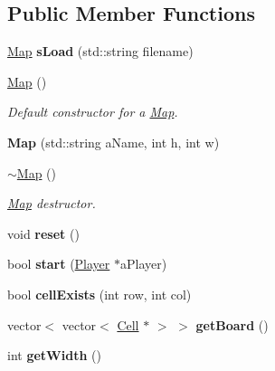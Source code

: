 \subsection*{Public Member Functions}
\begin{DoxyCompactItemize}
\item 
\hypertarget{class_map_ab98b96f44d9fef2a266556297cee71be}{}\label{class_map_ab98b96f44d9fef2a266556297cee71be} 
\hyperlink{class_map}{Map} {\bfseries s\+Load} (std\+::string filename)
\item 
\hyperlink{class_map_a0f5ad0fd4563497b4214038cbca8b582}{Map} ()
\begin{DoxyCompactList}\small\item\em Default constructor for a \hyperlink{class_map}{Map}. \end{DoxyCompactList}\item 
\hypertarget{class_map_a2edce4c7d4627d9f0ed6ae08021590ed}{}\label{class_map_a2edce4c7d4627d9f0ed6ae08021590ed} 
{\bfseries Map} (std\+::string a\+Name, int h, int w)
\item 
\hypertarget{class_map_aa403fbe09394ccf39747588f5168e3b2}{}\label{class_map_aa403fbe09394ccf39747588f5168e3b2} 
\hyperlink{class_map_aa403fbe09394ccf39747588f5168e3b2}{$\sim$\+Map} ()
\begin{DoxyCompactList}\small\item\em \hyperlink{class_map}{Map} destructor. \end{DoxyCompactList}\item 
\hypertarget{class_map_a904c445fdce79257fedeba09070cf88a}{}\label{class_map_a904c445fdce79257fedeba09070cf88a} 
void {\bfseries reset} ()
\item 
\hypertarget{class_map_af7c347ec2e29fc7b97c81730f94176f2}{}\label{class_map_af7c347ec2e29fc7b97c81730f94176f2} 
bool {\bfseries start} (\hyperlink{class_player}{Player} $\ast$a\+Player)
\item 
\hypertarget{class_map_ab22dc646bc833bb6b4070dcc2d3bd7c0}{}\label{class_map_ab22dc646bc833bb6b4070dcc2d3bd7c0} 
bool {\bfseries cell\+Exists} (int row, int col)
\item 
\hypertarget{class_map_acdfd27c6dfea00eabb9c69a596deef29}{}\label{class_map_acdfd27c6dfea00eabb9c69a596deef29} 
vector$<$ vector$<$ \hyperlink{class_cell}{Cell} $\ast$ $>$ $>$ {\bfseries get\+Board} ()
\item 
\hypertarget{class_map_afd34d12227676b3cebeed9f5fae2508f}{}\label{class_map_afd34d12227676b3cebeed9f5fae2508f} 
int {\bfseries get\+Width} ()
\item 

\end{DoxyCompactItemize}
